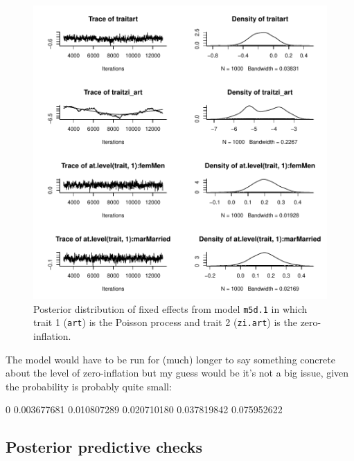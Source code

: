 \documentclass{article}
\begin{document}
\begin{figure}[!h]
\begin{center}
\includegraphics{Lecture5-039}
\end{center}
\caption{Posterior distribution of fixed effects from model \texttt{m5d.1} in which trait 1 (\texttt{art}) is the Poisson process and trait 2 (\texttt{zi.art}) is the zero-inflation.}
\label{ZIP}
\end{figure}

The model would have to be run for (much) longer to say something concrete about the level of zero-inflation but my guess would be it's not a big issue, given the probability is probably quite small:

\begin{Schunk}
\begin{Soutput}
         0%
0.003677681 0.010807289 0.020710180 0.037819842 0.075952622 
\end{Soutput}
\end{Schunk}

\subsection{Posterior predictive checks}
\end{document}
